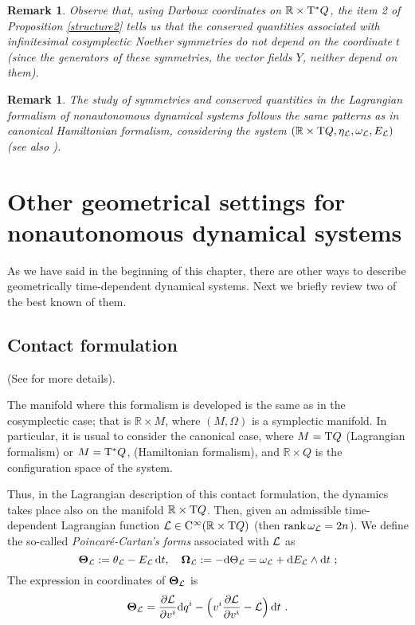 \documentclass[12pt]{report}
\newtheorem{remark}[teor]{Remark}
\def\derpar#1#2{\frac{\partial{#1}}{\partial{#2}}}
\def\Lag{{\cal L}}
\def\d{{\rm d}}
\def\Real{\mathbb{R}}
\def\Tan{{\rm T}}
\def\Cinfty{{\rm C}^\infty}
\begin{document}
\begin{remark}{\rm 
Observe that, using Darboux coordinates on $\Real\times\Tan^*Q$,
the item 2 of Proposition \ref{structure2} tells us that the conserved quantities
associated with  infinitesimal cosymplectic Noether symmetries
do not depend on the coordinate $t$
(since the generators of these symmetries,
the vector fields $Y$, neither depend on them).
}\end{remark}

\begin{remark}{\rm 
The study of symmetries and conserved quantities in the Lagrangian formalism of nonautonomous dynamical systems
follows the same patterns as in canonical Hamiltonian formalism, considering the system
$(\Real\times\Tan Q,\eta_\Lag,\omega_\Lag,E_\Lag)$ 
(see also \cite{Cr-77,SC-81}).
}\end{remark}


\section{Other geometrical settings for nonautonomous dynamical systems}


As we have said in the beginning of this chapter, there are other ways to describe geometrically
time-dependent dynamical systems.
Next we briefly review two of the best known of them.


\subsection{Contact formulation}


(See \cite{AM-78,CLM-94,CPT-hctd,EMR-gstds,EMR-sdtc,SC-81,SCC-84} for more details).

The manifold where this formalism is developed is the same as in the cosymplectic case;
that is $\Real\times M$, where $(M,\Omega)$ is a symplectic manifold.
In particular, it is usual to consider the canonical case, where
$M=\Tan Q$ (Lagrangian formalism) or $M=\Tan^*Q$, (Hamiltonian formalism),
and $\Real\times Q$ is the configuration space of the system.

Thus, in the Lagrangian description of this contact formulation,
the dynamics takes place also on the manifold $\Real\times\Tan Q$.
Then, given an admissible time-dependent Lagrangian function
${\cal L} \in\Cinfty(\Real\times\Tan Q)$
(then  ${\rm rank}\,\omega_\Lag=2n$).
We define the so-called {\sl Poincar\' e-Cartan's forms} associated with $\Lag$ as
$$
\mbox{\boldmath $\Theta$}_{\cal L}:=\theta_{\cal L}-E_\Lag\,\d t
,\quad
\mbox{\boldmath $\Omega$}_\Lag:=-\d\Theta_{\cal L} = \omega_{\cal L}+\d E_\Lag\wedge\d t \ ;
$$
The expression in coordinates of $\mbox{\boldmath $\Theta$}_{\cal L}$ is
$$
\mbox{\boldmath $\Theta$}_{\cal L}= \derpar{{\cal L}}{v^i}\d q^i -
\Big(v^i \derpar{{\cal L}}{v^i}-{\cal L}\Big)\,\d t \ .
$$
\end{document}
